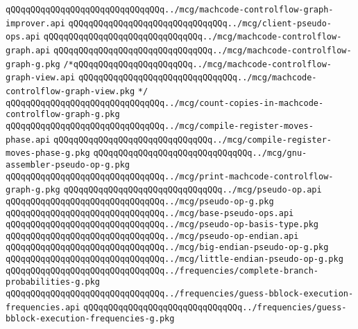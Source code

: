 \verb|qQQqqQQqqQQqqQQqqQQqqQQqqQQqqQQq../mcg/machcode-controlflow-graph-improver.api|\newline
\verb|qQQqqQQqqQQqqQQqqQQqqQQqqQQqqQQq../mcg/client-pseudo-ops.api|\newline
\verb|qQQqqQQqqQQqqQQqqQQqqQQqqQQqqQQq../mcg/machcode-controlflow-graph.api|\newline
\verb|qQQqqQQqqQQqqQQqqQQqqQQqqQQqqQQq../mcg/machcode-controlflow-graph-g.pkg|\newline
\verb|/*qQQqqQQqqQQqqQQqqQQqqQQq../mcg/machcode-controlflow-graph-view.api|\newline
\verb|qQQqqQQqqQQqqQQqqQQqqQQqqQQqqQQq../mcg/machcode-controlflow-graph-view.pkg|\newline
\verb|*/|\newline
\verb|qQQqqQQqqQQqqQQqqQQqqQQqqQQqqQQq../mcg/count-copies-in-machcode-controlflow-graph-g.pkg|\newline
\verb|qQQqqQQqqQQqqQQqqQQqqQQqqQQqqQQq../mcg/compile-register-moves-phase.api|\newline
\verb|qQQqqQQqqQQqqQQqqQQqqQQqqQQqqQQq../mcg/compile-register-moves-phase-g.pkg|\newline
\verb|qQQqqQQqqQQqqQQqqQQqqQQqqQQqqQQq../mcg/gnu-assembler-pseudo-op-g.pkg|\newline
\verb|qQQqqQQqqQQqqQQqqQQqqQQqqQQqqQQq../mcg/print-machcode-controlflow-graph-g.pkg|\newline
\verb|qQQqqQQqqQQqqQQqqQQqqQQqqQQqqQQq../mcg/pseudo-op.api|\newline
\verb|qQQqqQQqqQQqqQQqqQQqqQQqqQQqqQQq../mcg/pseudo-op-g.pkg|\newline
\verb|qQQqqQQqqQQqqQQqqQQqqQQqqQQqqQQq../mcg/base-pseudo-ops.api|\newline
\verb|qQQqqQQqqQQqqQQqqQQqqQQqqQQqqQQq../mcg/pseudo-op-basis-type.pkg|\newline
\verb|qQQqqQQqqQQqqQQqqQQqqQQqqQQqqQQq../mcg/pseudo-op-endian.api|\newline
\verb|qQQqqQQqqQQqqQQqqQQqqQQqqQQqqQQq../mcg/big-endian-pseudo-op-g.pkg|\newline
\verb|qQQqqQQqqQQqqQQqqQQqqQQqqQQqqQQq../mcg/little-endian-pseudo-op-g.pkg|\newline
\verb|qQQqqQQqqQQqqQQqqQQqqQQqqQQqqQQq../frequencies/complete-branch-probabilities-g.pkg|\newline
\verb|qQQqqQQqqQQqqQQqqQQqqQQqqQQqqQQq../frequencies/guess-bblock-execution-frequencies.api|\newline
\verb|qQQqqQQqqQQqqQQqqQQqqQQqqQQqqQQq../frequencies/guess-bblock-execution-frequencies-g.pkg|\newline
